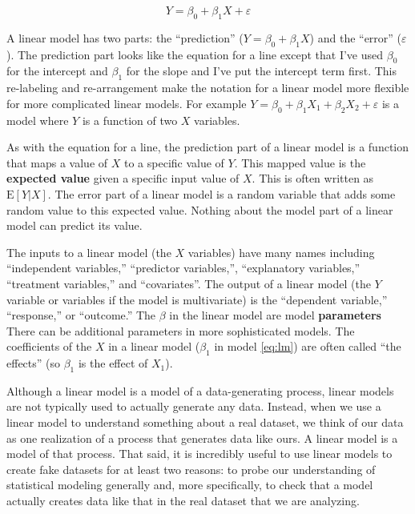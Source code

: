 \documentclass[]{book}
\theoremstyle{definition}
\theoremstyle{definition}
\theoremstyle{definition}
\theoremstyle{remark}
\begin{document}
\begin{equation}
Y = \beta_0 + \beta_1 X + \varepsilon
\label{eq:lm}
\end{equation}

A linear model has two parts: the ``prediction''
(\(Y = \beta_0 + \beta_1 X\)) and the ``error'' (\(\varepsilon\)). The
prediction part looks like the equation for a line except that I've used
\(\beta_0\) for the intercept and \(\beta_1\) for the slope and I've put
the intercept term first. This re-labeling and re-arrangement make the
notation for a linear model more flexible for more complicated linear
models. For example
\(Y = \beta_0 + \beta_1 X_1 + \beta_2 X_2 + \varepsilon\) is a model
where \(Y\) is a function of two \(X\) variables.

As with the equation for a line, the prediction part of a linear model
is a function that maps a value of \(X\) to a specific value of \(Y\).
This mapped value is the \textbf{expected value} given a specific input
value of \(X\). This is often written as \(\mathrm{E}[Y|X]\). The error
part of a linear model is a random variable that adds some random value
to this expected value. Nothing about the model part of a linear model
can predict its value.

The inputs to a linear model (the \(X\) variables) have many names
including ``independent variables,'' ``predictor variables,'',
``explanatory variables,'' ``treatment variables,'' and ``covariates''.
The output of a linear model (the \(Y\) variable or variables if the
model is multivariate) is the ``dependent variable,'' ``response,'' or
``outcome.'' The \(\beta\) in the linear model are model
\textbf{parameters} There can be additional parameters in more
sophisticated models. The coefficients of the \(X\) in a linear model
(\(\beta_1\) in model \eqref{eq:lm}) are often called ``the effects'' (so
\(\beta_1\) is the effect of \(X_1\)).

Although a linear model is a model of a data-generating process, linear
models are not typically used to actually generate any data. Instead,
when we use a linear model to understand something about a real dataset,
we think of our data as one realization of a process that generates data
like ours. A linear model is a model of that process. That said, it is
incredibly useful to use linear models to create fake datasets for at
least two reasons: to probe our understanding of statistical modeling
generally and, more specifically, to check that a model actually creates
data like that in the real dataset that we are analyzing.
\end{document}
